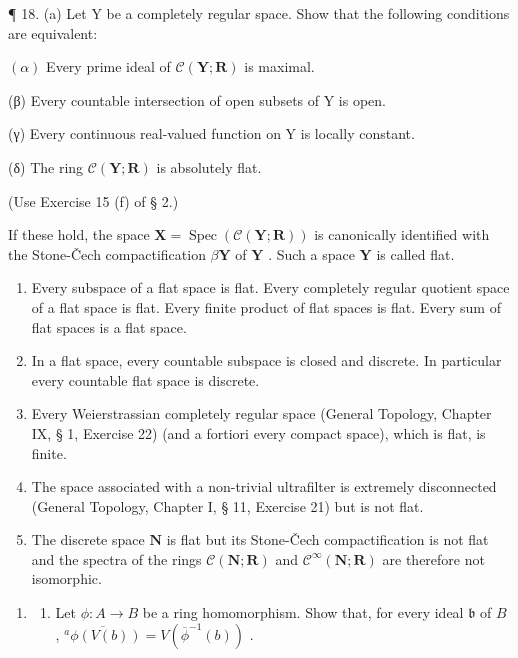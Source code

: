 ¶ 18. (a) Let Y be a completely regular space. Show that the following conditions are equivalent:

\((\alpha)\) Every prime ideal of \(\mathcal{C}(\mathbf{Y};\mathbf{R})\) is maximal.

(β) Every countable intersection of open subsets of Y is open.

(γ) Every continuous real-valued function on Y is locally constant.

(δ) The ring \(\mathcal{C}(\mathbf{Y};\mathbf{R})\) is absolutely flat.

(Use Exercise 15 (f) of § 2.)

If these hold, the space \(\mathbf{X} = \operatorname{Spec}(\mathcal{C}(\mathbf{Y};\mathbf{R}))\) is canonically identified with the Stone-Čech compactification \(\beta \mathbf{Y}\) of \(\mathbf{Y}\) . Such a space \(\mathbf{Y}\) is called flat.

\begin{enumerate}
\def\labelenumi{(\alph{enumi})}
\setcounter{enumi}{1}
\item
  Every subspace of a flat space is flat. Every completely regular quotient space of a flat space is flat. Every finite product of flat spaces is flat. Every sum of flat spaces is a flat space.
\item
  In a flat space, every countable subspace is closed and discrete. In particular every countable flat space is discrete.
\item
  Every Weierstrassian completely regular space (General Topology, Chapter IX, § 1, Exercise 22) (and a fortiori every compact space), which is flat, is finite.
\item
  The space associated with a non-trivial ultrafilter is extremely disconnected (General Topology, Chapter I, § 11, Exercise 21) but is not flat.
\item
  The discrete space \(\mathbf{N}\) is flat but its Stone-Čech compactification is not flat and the spectra of the rings \(\mathcal{C}(\mathbf{N};\mathbf{R})\) and \(\mathcal{C}^{\infty}(\mathbf{N};\mathbf{R})\) are therefore not isomorphic.
\end{enumerate}

\begin{enumerate}
\def\labelenumi{\arabic{enumi}.}
\setcounter{enumi}{18}
\tightlist
\item
  \begin{enumerate}
  \def\labelenumii{(\alph{enumii})}
  \tightlist
  \item
    Let \(\phi: A \to B\) be a ring homomorphism. Show that, for every ideal \(\mathfrak{b}\) of \(B\) , \(\overline{^a\phi(V(b))} = V(\overline{\phi}^{-1}(b))\) .
  \end{enumerate}
\end{enumerate}

